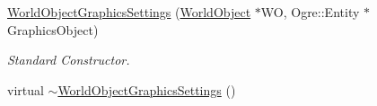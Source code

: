\begin{DoxyCompactItemize}
\item 
\hyperlink{classMezzanine_1_1WorldObjectGraphicsSettings_a0000391cba0056b375dc324833ef747d}{WorldObjectGraphicsSettings} (\hyperlink{classMezzanine_1_1WorldObject}{WorldObject} $\ast$WO, Ogre::Entity $\ast$GraphicsObject)
\begin{DoxyCompactList}\small\item\em Standard Constructor. \item\end{DoxyCompactList}\item 
\hypertarget{classMezzanine_1_1WorldObjectGraphicsSettings_a72709c5d15de08cba37501510a87bfca}{
virtual \hyperlink{classMezzanine_1_1WorldObjectGraphicsSettings_a72709c5d15de08cba37501510a87bfca}{$\sim$WorldObjectGraphicsSettings} ()}
\label{classMezzanine_1_1WorldObjectGraphicsSettings_a72709c5d15de08cba37501510a87bfca}


\end{DoxyCompactItemize}
